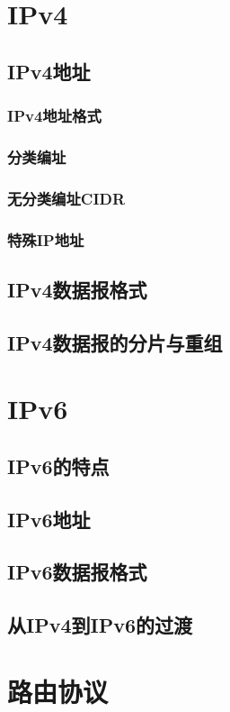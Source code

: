 \documentclass[lang=cn,newtx,10pt,scheme=chinese]{../../elegantbook}
\begin{document}
\section{IPv4}
\subsection{IPv4地址}
\subsubsection{IPv4地址格式}
\subsubsection{分类编址}
\subsubsection{无分类编址CIDR}
\subsubsection{特殊IP地址}
\subsection{IPv4数据报格式}
\subsection{IPv4数据报的分片与重组}

\section{IPv6}
\subsection{IPv6的特点}
\subsection{IPv6地址}
\subsection{IPv6数据报格式}
\subsection{从IPv4到IPv6的过渡}

\section{路由协议}
\end{document}
